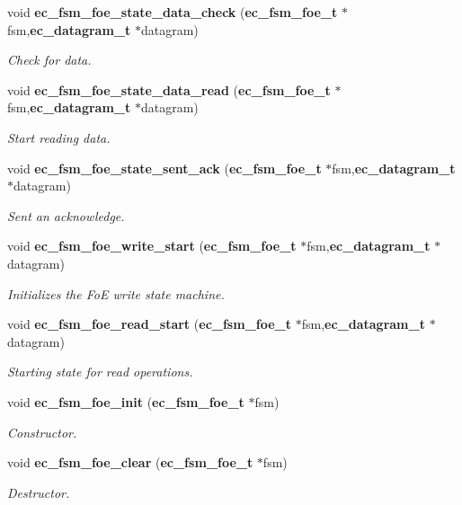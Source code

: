 \begin{DoxyCompactItemize}
void {\bf ec\-\_\-fsm\-\_\-foe\-\_\-state\-\_\-data\-\_\-check} ({\bf ec\-\_\-fsm\-\_\-foe\-\_\-t} $\ast$fsm,{\bf ec\-\_\-datagram\-\_\-t} $\ast$datagram)
\begin{DoxyCompactList}\small\item\em Check for data. \end{DoxyCompactList}\item 
void {\bf ec\-\_\-fsm\-\_\-foe\-\_\-state\-\_\-data\-\_\-read} ({\bf ec\-\_\-fsm\-\_\-foe\-\_\-t} $\ast$fsm,{\bf ec\-\_\-datagram\-\_\-t} $\ast$datagram)
\begin{DoxyCompactList}\small\item\em Start reading data. \end{DoxyCompactList}\item 
void {\bf ec\-\_\-fsm\-\_\-foe\-\_\-state\-\_\-sent\-\_\-ack} ({\bf ec\-\_\-fsm\-\_\-foe\-\_\-t} $\ast$fsm,{\bf ec\-\_\-datagram\-\_\-t} $\ast$datagram)
\begin{DoxyCompactList}\small\item\em Sent an acknowledge. \end{DoxyCompactList}\item 
void {\bf ec\-\_\-fsm\-\_\-foe\-\_\-write\-\_\-start} ({\bf ec\-\_\-fsm\-\_\-foe\-\_\-t} $\ast$fsm,{\bf ec\-\_\-datagram\-\_\-t} $\ast$datagram)
\begin{DoxyCompactList}\small\item\em Initializes the Fo\-E write state machine. \end{DoxyCompactList}\item 
void {\bf ec\-\_\-fsm\-\_\-foe\-\_\-read\-\_\-start} ({\bf ec\-\_\-fsm\-\_\-foe\-\_\-t} $\ast$fsm,{\bf ec\-\_\-datagram\-\_\-t} $\ast$datagram)
\begin{DoxyCompactList}\small\item\em Starting state for read operations. \end{DoxyCompactList}\item 
void {\bf ec\-\_\-fsm\-\_\-foe\-\_\-init} ({\bf ec\-\_\-fsm\-\_\-foe\-\_\-t} $\ast$fsm)
\begin{DoxyCompactList}\small\item\em Constructor. \end{DoxyCompactList}\item 
void {\bf ec\-\_\-fsm\-\_\-foe\-\_\-clear} ({\bf ec\-\_\-fsm\-\_\-foe\-\_\-t} $\ast$fsm)
\begin{DoxyCompactList}\small\item\em Destructor. \end{DoxyCompactList}\item 

\end{DoxyCompactItemize}
